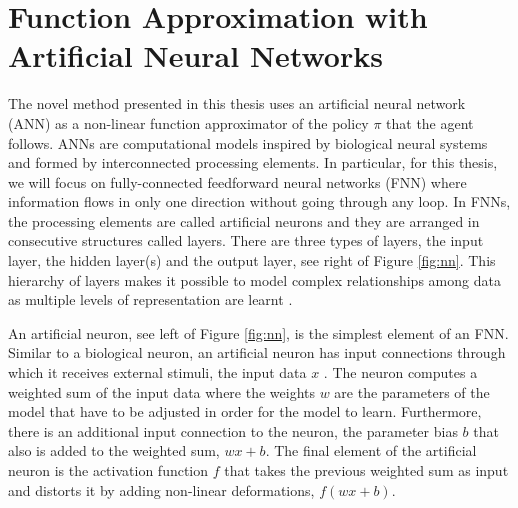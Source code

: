 


\section{Function Approximation with Artificial Neural Networks}
\label{section:Function Approximation with Artificial Neural Networks}

The novel method presented in this thesis uses an artificial neural network (ANN) as a non-linear function approximator of the policy $\pi$ that the agent follows. ANNs are computational models inspired by biological neural systems and formed by interconnected processing elements. In particular, for this thesis, we will focus on fully-connected feedforward neural networks (FNN) where information flows in only one direction without going through any loop. In FNNs, the processing elements are called artificial neurons and they are arranged in consecutive structures called layers. There are three types of layers, the input layer, the hidden layer(s) and the output layer, see right of Figure \ref{fig:nn}. This hierarchy of layers makes it possible to model complex relationships among data as multiple levels of representation are learnt \cite{ANNs}.




An artificial neuron, see left of Figure \ref{fig:nn}, is the simplest element of an FNN. Similar to a biological neuron, an artificial neuron has input connections through which it receives external stimuli, the input data $x$ \cite{ANN-graupe:2013}. The neuron computes a weighted sum of the input data where the weights $w$ are the parameters of the model that have to be adjusted in order for the model to learn. Furthermore, there is an additional input connection to the neuron, the parameter bias $b$ that also is added to the weighted sum, $wx + b$. The final element of the artificial neuron is the activation function $f$ that takes the previous weighted sum as input and distorts it by adding non-linear deformations, $f(wx + b)$.



